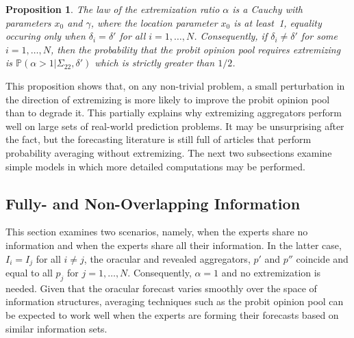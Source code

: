 \documentclass[11pt]{article}
\renewcommand{\P}{\mathbb{P}}
\newtheorem{proposition}[theorem]{Proposition}
\theoremstyle{definition}
\theoremstyle{definition}
\def\P{{\mathbb P}}
\begin{document}
\begin{proposition}
\label{positiveProbThm}
The law of the extremization ratio $\alpha$ is a Cauchy with 
parameters $x_0$ and $\gamma$, where the location parameter 
$x_0$ is at least~1, equality occuring only when $\delta_i = \delta'$ 
for all $i = 1, \dots, N$. Consequently, if $\delta_i \neq \delta'$ 
for some $i = 1, \dots, N$, then the probability that the probit 
opinion pool requires extremizing is $\P(\alpha > 1 | \Sigma_{22}, \delta')$
which is strictly greater than $1/2$. 
\end{proposition}
\noindent
This proposition shows that, on any non-trivial problem, a small
perturbation in the direction of extremizing is more likely to 
improve the probit opinion pool than to degrade it.  This partially 
explains why extremizing aggregators perform well on large sets of 
real-world prediction problems.  It may be unsurprising after the fact,
but the forecasting literature is still full of articles that perform 
probability averaging without extremizing.  The next two 
subsections examine simple models in which more detailed 
computations may be performed.  

\subsection{Fully- and Non-Overlapping Information}
\label{disjoint}
This section examines two scenarios, namely, when the experts share no information and when the experts share all their information. In the latter case, $I_{i} = I_j$ for all $i \neq j$, the oracular and revealed aggregators, $p'$ and $p''$ coincide and equal to all $p_j$ for $j = 1, \dots, N$. Consequently, $\alpha = 1$ and no extremization is needed. Given that the oracular forecast varies smoothly over the space of  information structures, averaging techniques such as the probit opinion pool can be expected to work well when the experts are forming their forecasts based on similar information sets.
\end{document}
